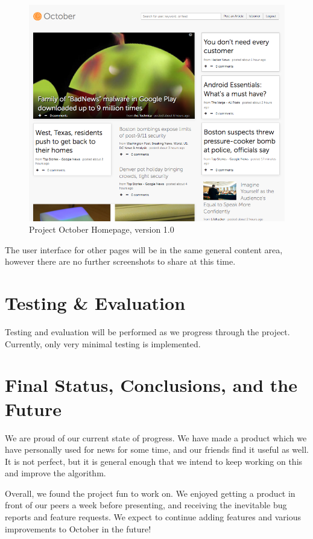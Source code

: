 \documentclass[11pt,letterpaper]{article}
\begin{document}
\begin{figure}
\centering
\includegraphics[scale=0.6]{img/homepage-v1.png}
\caption{Project October Homepage, version 1.0}
\label{fig:homepage-v1.0}
\end{figure}

The user interface for other pages will be in the same general content area, however there are no further screenshots to share at this time.

\section{Testing \& Evaluation}
\label{sec:testing}
Testing and evaluation will be performed as we progress through the project. Currently, only very minimal testing is implemented.

\section{Final Status, Conclusions, and the Future}
\label{sec:progress}
We are proud of our current state of progress.
We have made a product which we have personally used for news for some time, and our friends find it useful as well.
It is not perfect, but it is general enough that we intend to keep working on this and improve the algorithm.

Overall, we found the project fun to work on.
We enjoyed getting a product in front of our peers a week before presenting, and receiving the inevitable bug reports and feature requests.
We expect to continue adding features and various improvements to October in the future!
\end{document}
